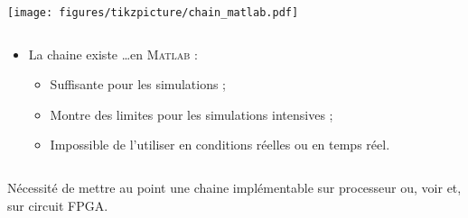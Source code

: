 \documentclass[../main.tex]{subfiles}
\begin{document}


\begin{frame}{\subsecname}
  \begin{center}
    \texttt{[image: figures/tikzpicture/chain\_matlab.pdf]}
  \end{center}
  \begin{columns}
    \begin{column}{.8\linewidth}
      \begin{itemize}
        \item La chaine existe \dots en \textsc{Matlab} :
        \begin{itemize}
          \item Suffisante pour les simulations ;
          \item Montre des limites pour les simulations intensives ;
          \item Impossible de l'utiliser en conditions réelles ou en temps réel.
        \end{itemize}
      \end{itemize}
    \end{column}
  \end{columns} \vspace{1 em}
  
  \begin{center}
    \large Nécessité de mettre au point une chaine implémentable sur processeur ou, voir et, sur circuit FPGA. 
  \end{center}
\end{frame}
\end{document}
